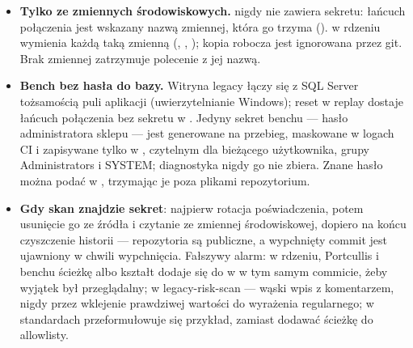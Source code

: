 \begin{itemize}
  \item \textbf{Tylko ze zmiennych środowiskowych.}  nigdy nie
        zawiera sekretu: łańcuch połączenia jest wskazany nazwą zmiennej, która go trzyma
        ().  w rdzeniu wymienia
        każdą taką zmienną (, ,
        ); kopia robocza  jest ignorowana przez
        git. Brak zmiennej zatrzymuje polecenie z jej nazwą.
  \item \textbf{Bench bez hasła do bazy.} Witryna legacy łączy się z SQL Server tożsamością
        puli aplikacji (uwierzytelnianie Windows); reset w replay dostaje łańcuch połączenia
        bez sekretu w . Jedyny sekret benchu --- hasło
        administratora sklepu --- jest generowane na przebieg, maskowane w logach CI i
        zapisywane tylko w , czytelnym dla bieżącego
        użytkownika, grupy Administrators i SYSTEM; diagnostyka nigdy go nie zbiera. Znane
        hasło można podać w , trzymając je poza plikami
        repozytorium.
  \item \textbf{Gdy skan znajdzie sekret}: najpierw rotacja poświadczenia, potem usunięcie go
        ze źródła i czytanie ze zmiennej środowiskowej, dopiero na końcu czyszczenie historii
        --- repozytoria są publiczne, a wypchnięty commit jest ujawniony w chwili
        wypchnięcia. Fałszywy alarm: w rdzeniu, Portcullis i benchu ścieżkę albo kształt
        dodaje się do \repopath{[allowlist]} w  w tym samym commicie,
        żeby wyjątek był przeglądalny; w legacy-risk-scan --- wąski wpis z komentarzem, nigdy
        przez wklejenie prawdziwej wartości do wyrażenia regularnego; w standardach
        przeformułowuje się przykład, zamiast dodawać ścieżkę do allowlisty.
\end{itemize}


